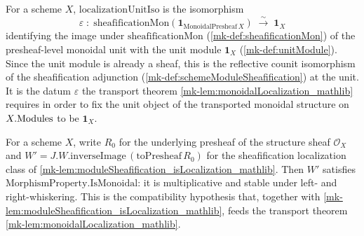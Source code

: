 \begin{definition}\label{mk-def:localizationUnitIso}
  \leanok

  For a scheme \(X\), \(\mathrm{localizationUnitIso}\) is the isomorphism
  \[
    \varepsilon \;:\;
      \mathrm{sheafificationMon}(\mathbf{1}_{\mathrm{MonoidalPresheaf}\,X})
      \;\xrightarrow{\ \sim\ }\; \mathbf{1}_X
  \]
  identifying the image under \(\mathrm{sheafificationMon}\)
  (\ref{mk-def:sheafificationMon}) of the presheaf-level monoidal unit with the
  unit module \(\mathbf{1}_X\) (\ref{mk-def:unitModule}). Since the unit module is
  already a sheaf, this is the reflective counit isomorphism of the
  sheafification adjunction (\ref{mk-def:schemeModuleSheafification}) at the unit.
  It is the datum \(\varepsilon\) the transport theorem
  \ref{mk-lem:monoidalLocalization_mathlib} requires in order to fix the unit
  object of the transported monoidal structure on \(X.\mathrm{Modules}\) to be
  \(\mathbf{1}_X\).
\end{definition}

\begin{definition}\label{mk-def:sheafModule_W_isMonoidal}
  \leanok

  For a scheme \(X\), write \(R_0\) for the underlying presheaf of the structure
  sheaf \(\mathcal{O}_X\) and
  \(W' = J.W.\mathrm{inverseImage}\,(\mathrm{toPresheaf}\,R_0)\) for the
  sheafification localization class of
  \ref{mk-lem:moduleSheafification_isLocalization_mathlib}. Then \(W'\) satisfies
  \(\mathrm{MorphismProperty.IsMonoidal}\): it is multiplicative and stable under
  left- and right-whiskering. This is the compatibility hypothesis that, together
  with \ref{mk-lem:moduleSheafification_isLocalization_mathlib}, feeds the transport
  theorem \ref{mk-lem:monoidalLocalization_mathlib}.
\end{definition}

